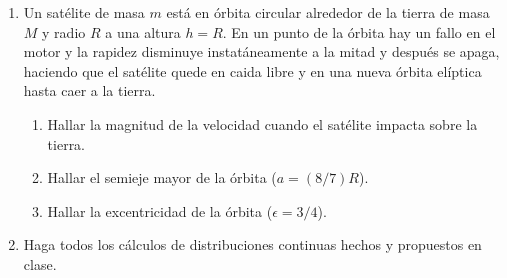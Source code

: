 \documentclass[11pt,twocolumn]{article}
\begin{document}
\begin{enumerate}
\item Un satélite de masa $m$ está en órbita circular alrededor de la tierra de masa $M$ y radio $R$ a una altura $h=R$. En un punto de la órbita hay un fallo en el motor y la rapidez disminuye instatáneamente a la mitad y después se apaga, haciendo que el satélite quede en caida libre y en una nueva órbita elíptica hasta caer a la tierra.
\begin{enumerate}
\item Hallar la magnitud de la velocidad cuando el satélite impacta sobre la tierra.
\item Hallar el semieje mayor de la órbita ($a=(8/7)R$).
\item Hallar la excentricidad de la órbita ($\epsilon=3/4$).
\end{enumerate}

\item Haga todos los cálculos de distribuciones continuas hechos y propuestos en clase.


\end{enumerate}
\end{document}
